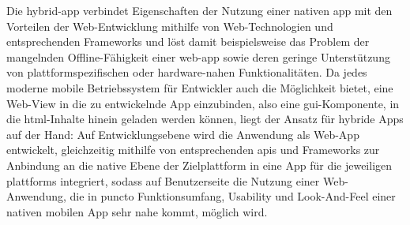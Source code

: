 Die \gls{hybrid-app} verbindet Eigenschaften der Nutzung einer nativen \gls{app} mit den Vorteilen der Web-Entwicklung mithilfe von Web-Technologien und entsprechenden Frameworks und löst damit beispielsweise das Problem der mangelnden Offline-Fähigkeit einer \gls{web-app} sowie deren geringe Unterstützung von plattformspezifischen oder hardware-nahen Funktionalitäten. 
Da jedes moderne mobile Betriebssystem für Entwickler auch die Möglichkeit bietet, eine Web-View in die zu entwickelnde App einzubinden, also eine \gls{gui}-Komponente, in die \gls{html}-Inhalte hinein geladen werden können, liegt der Ansatz für hybride Apps auf der Hand: Auf Entwicklungsebene wird die Anwendung als Web-App entwickelt, gleichzeitig mithilfe von entsprechenden \glspl{api} und Frameworks zur Anbindung an die native Ebene der Zielplattform in eine App für die jeweiligen \glspl{plattform} integriert, sodass auf Benutzerseite die Nutzung einer Web-Anwendung, die in puncto Funktionsumfang, Usability und Look-And-Feel einer nativen mobilen App sehr nahe kommt, möglich wird.

